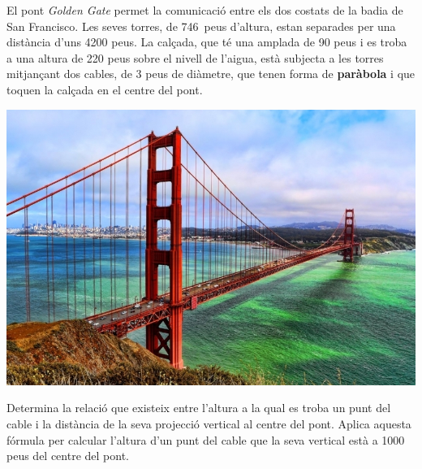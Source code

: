 \begin{mylist}
	\vspace{-2.5cm}
\exer  \begin{minipage}[t]{0.65\textwidth}
	El pont \textit{Golden Gate} permet la comunicació entre els dos costats de la badia de San Francisco. Les seves torres, de 746~peus d'altura, estan separades per una distància d'uns 4200 peus. La calçada, que té una amplada de 90 peus i es troba a una altura de 220 peus sobre el nivell de l'aigua, està subjecta a les torres mitjançant dos cables, de 3 peus de diàmetre, que tenen forma de \textbf{paràbola} i que toquen la calçada en el centre del pont. 
\end{minipage}
\begin{minipage}{0.25\textwidth}
	\vspace{2.5cm}
	\raggedright
	\includegraphics*[width=1.1\textwidth]{img-08/goldenbridge}
\end{minipage}

\begin{tasks} 
	\task  Determina la relació que existeix entre l'altura a la qual es troba un punt del cable i la distància de la seva projecció vertical al  centre del pont. 
	\task  Aplica aquesta fórmula per calcular l'altura d'un punt del cable que la seva vertical està a 1000 peus del centre del pont.
\end{tasks}

\answers{[Respecte el centre el pont $y=0.0001193 x^2$, 119.27 peus d'altura]}

\end{mylist}
 

